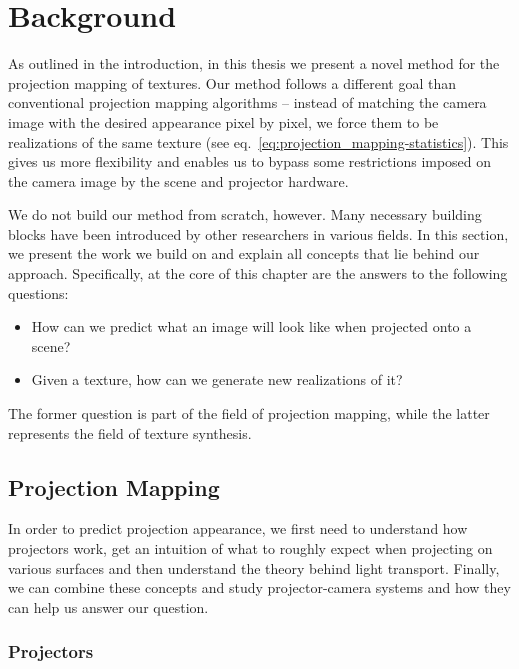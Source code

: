 \chapter{Background}
\label{chapter:background} 

As outlined in the introduction, in this thesis we present a novel method for the projection mapping of textures. Our method follows a different goal than conventional projection mapping algorithms -- instead of matching the camera image with the desired appearance pixel by pixel, we force them to be realizations of the same texture (see eq.~\ref{eq:projection_mapping-statistics}). This gives us more flexibility and enables us to bypass some restrictions imposed on the camera image by the scene and projector hardware.

We do not build our method from scratch, however. Many necessary building blocks have been introduced by other researchers in various fields. In this section, we present the work we build on and explain all concepts that lie behind our approach. Specifically, at the core of this chapter are the answers to the following questions:

\begin{itemize}
    \item How can we predict what an image will look like when projected onto a scene?
    \item Given a texture, how can we generate new realizations of it?
\end{itemize}

The former question is part of the field of projection mapping, while the latter represents the field of texture synthesis.

\section{Projection Mapping}
\label{section:background-projection_mapping}

In order to predict projection appearance, we first need to understand how projectors work, get an intuition of what to roughly expect when projecting on various surfaces and then understand the theory behind light transport. Finally, we can combine these concepts and study projector-camera systems and how they can help us answer our question.

\subsection{Projectors}
\label{section:background-projection_mapping-projectors}

